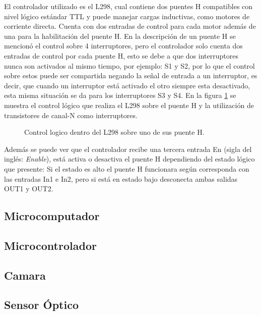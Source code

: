 \documentclass{iccmemoria}
\begin{document}
El controlador utilizado es el L298, cual contiene dos puentes H compatibles con nivel lógico estándar TTL y puede manejar cargas inductivas, como motores de corriente directa. Cuenta con dos entradas de control para cada motor además de una para la habilitación del puente H. En la descripción de un puente H se mencionó el control sobre 4 interruptores, pero el controlador solo cuenta dos entradas de control por cada puente H, esto se debe a que dos interruptores nunca son activados al mismo tiempo, por ejemplo: S1 y S2, por lo que el control sobre estos puede ser compartida negando la señal de entrada a un interruptor, es decir, que cuando un interruptor está activado el otro siempre esta desactivado, esta misma situación se da para los interruptores S3 y S4. En la figura \ref{fig:H bridge circuit} se muestra el control lógico que realiza el L298 sobre el puente H y la utilización de transistores de canal-N  como interruptores.\\

\begin{figure}[H]
  \centering
  \selectfont{
  
  }
  \caption{Control logico dentro del L298 sobre uno de sus puente H.}
  \label{fig:H bridge circuit}
\end{figure}

Además se puede ver que el controlador recibe una tercera entrada En (sigla del inglés: \emph{Enable}), está activa o desactiva el puente H dependiendo del estado lógico que presente: Si el estado es alto el puente H funcionara según corresponda con las entradas In1 e In2, pero si está en estado bajo desconecta ambas salidas OUT1 y OUT2.

\subsection{Microcomputador}

\subsection{Microcontrolador}

\subsection{Camara}

\subsection{Sensor Óptico}
\end{document}

